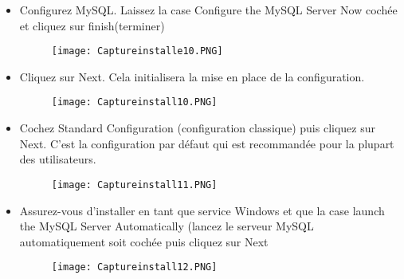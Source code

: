 \documentclass{beamer}
\begin{document}
 
 \begin{frame}
\begin{itemize}
    
     \item Configurez MySQL. Laissez la case Configure the MySQL Server Now coch\'ee et cliquez sur finish(terminer)
           \begin{figure}[h]
\centering	
 \texttt{[image: Captureinstalle10.PNG]}
\end{figure}
     \end{itemize}
     
 \end{frame}
 
 \begin{frame}
\begin{itemize}
    
     \item Cliquez sur Next. Cela initialisera la mise en place de la configuration.
           \begin{figure}[h]
\centering	
 \texttt{[image: Captureinstall10.PNG]}
\end{figure}
     \end{itemize}
     
 \end{frame}
  \begin{frame}
\begin{itemize}
    
     \item Cochez Standard Configuration (configuration classique) puis cliquez sur Next. C'est la configuration par d\'efaut qui est recommand\'ee pour la plupart des utilisateurs.
           \begin{figure}[h]
\centering	
 \texttt{[image: Captureinstall11.PNG]}
\end{figure}
     \end{itemize}
     
 \end{frame}
  \begin{frame}
\begin{itemize}
    
     \item Assurez-vous d'installer en tant que service Windows et que la case launch the MySQL Server Automatically (lancez le serveur MySQL automatiquement soit cochée puis cliquez sur Next
           \begin{figure}[h]
\centering	
 \texttt{[image: Captureinstall12.PNG]}
\end{figure}
     \end{itemize}
     
 \end{frame}
\end{document}
